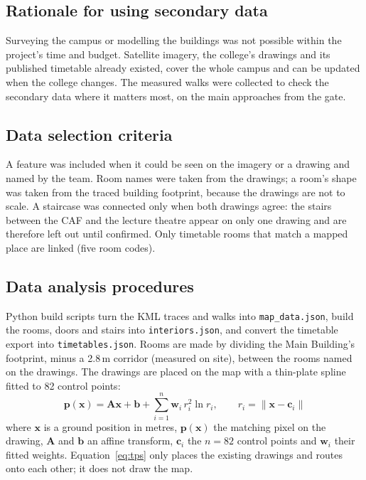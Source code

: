 \documentclass[12pt,a4paper]{report}
\begin{document}
\subsection{Rationale for using secondary data}
Surveying the campus or modelling the buildings was not possible within the project's time and budget. Satellite imagery, the college's drawings and its published timetable already existed, cover the whole campus and can be updated when the college changes. The measured walks were collected to check the secondary data where it matters most, on the main approaches from the gate.

\subsection{Data selection criteria}
A feature was included when it could be seen on the imagery or a drawing and named by the team. Room names were taken from the drawings; a room's shape was taken from the traced building footprint, because the drawings are not to scale. A staircase was connected only when both drawings agree: the stairs between the CAF and the lecture theatre appear on only one drawing and are therefore left out until confirmed. Only timetable rooms that match a mapped place are linked (five room codes).

\subsection{Data analysis procedures}
Python build scripts turn the KML traces and walks into \texttt{map\_data.json}, build the rooms, doors and stairs into \texttt{interiors.json}, and convert the timetable export into \texttt{timetables.json}. Rooms are made by dividing the Main Building's footprint, minus a 2.8\,m corridor (measured on site), between the rooms named on the drawings. The drawings are placed on the map with a thin-plate spline \citep{bookstein1989} fitted to 82 control points:
\begin{equation}\label{eq:tps}
  \mathbf{p}(\mathbf{x}) = \mathbf{A}\mathbf{x} + \mathbf{b} + \sum_{i=1}^{n} \mathbf{w}_i\, r_i^{2} \ln r_i, \qquad r_i = \lVert \mathbf{x} - \mathbf{c}_i \rVert
\end{equation}
where $\mathbf{x}$ is a ground position in metres, $\mathbf{p}(\mathbf{x})$ the matching pixel on the drawing, $\mathbf{A}$ and $\mathbf{b}$ an affine transform, $\mathbf{c}_i$ the $n=82$ control points and $\mathbf{w}_i$ their fitted weights. Equation~\ref{eq:tps} only places the existing drawings and routes onto each other; it does not draw the map.
\end{document}
